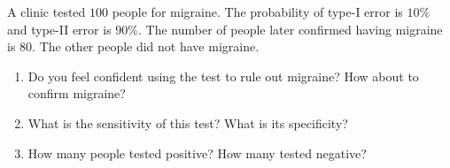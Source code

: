 \documentclass[../main.tex]{subfiles}
\begin{document}
\begin{exercise}
  A clinic tested \(100\) people for migraine.  The probability of type-I error is \(10\%\) and type-II error is \(90\%\).  The number of people later confirmed having migraine is \(80\). The other people did not have migraine.

  \begin{enumerate}[wide]
    \item Do you feel confident using the test to rule out migraine? How about to confirm migraine?

    \item What is the sensitivity of this test? What is its specificity?

    \item How many people tested positive? How many tested negative?

  \end{enumerate}
\end{exercise}
\end{document}
